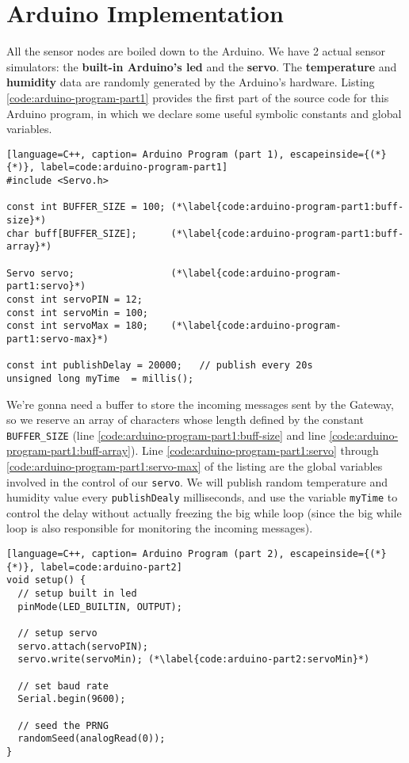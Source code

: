 \section{Arduino Implementation}
All the sensor nodes are boiled down to the Arduino. We have 2 actual sensor simulators: the \textbf{built-in Arduino's led} and the \textbf{servo}. The \textbf{temperature} and \textbf{humidity} data are randomly generated by the Arduino's hardware. Listing \ref{code:arduino-program-part1} provides the first part of the source code for this Arduino program, in which we declare some useful symbolic constants and global variables.

\begin{lstlisting}[language=C++, caption= Arduino Program (part 1), escapeinside={(*}{*)}, label=code:arduino-program-part1]
#include <Servo.h>

const int BUFFER_SIZE = 100; (*\label{code:arduino-program-part1:buff-size}*)
char buff[BUFFER_SIZE];      (*\label{code:arduino-program-part1:buff-array}*)

Servo servo;                 (*\label{code:arduino-program-part1:servo}*)
const int servoPIN = 12;
const int servoMin = 100;
const int servoMax = 180;    (*\label{code:arduino-program-part1:servo-max}*)

const int publishDelay = 20000;   // publish every 20s
unsigned long myTime  = millis();
\end{lstlisting}
We're gonna need a buffer to store the incoming messages sent by the Gateway, so we reserve an array of characters whose length defined by the constant \texttt{BUFFER\_SIZE} (line \ref{code:arduino-program-part1:buff-size} and line \ref{code:arduino-program-part1:buff-array}). Line \ref{code:arduino-program-part1:servo} through \ref{code:arduino-program-part1:servo-max} of the listing are the global variables involved in the control of our \texttt{servo}. We will publish random temperature and humidity value every \texttt{publishDealy} milliseconds, and use the variable \texttt{myTime} to control the delay without actually freezing the big while loop (since the big while loop is also responsible for monitoring the incoming messages).
\begin{lstlisting}[language=C++, caption= Arduino Program (part 2), escapeinside={(*}{*)}, label=code:arduino-part2]
void setup() {
  // setup built in led
  pinMode(LED_BUILTIN, OUTPUT);

  // setup servo
  servo.attach(servoPIN);
  servo.write(servoMin); (*\label{code:arduino-part2:servoMin}*)
  
  // set baud rate
  Serial.begin(9600);

  // seed the PRNG
  randomSeed(analogRead(0));
}
\end{lstlisting}
